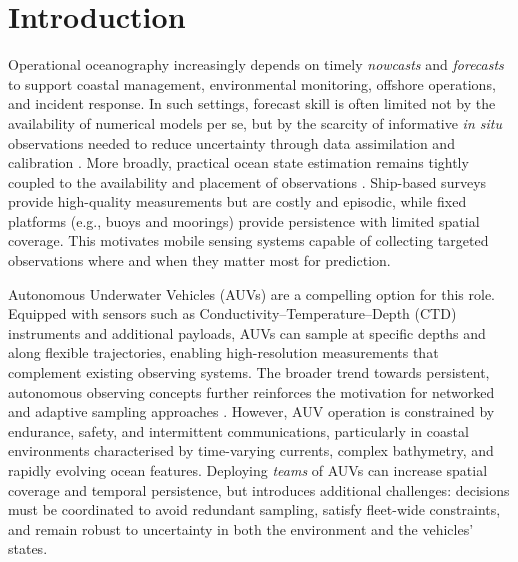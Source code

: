 \chapter{Introduction} \label{chap:intro}

Operational oceanography increasingly depends on timely \emph{nowcasts} and \emph{forecasts} to support coastal
management, environmental monitoring, offshore operations, and incident response. In such settings, forecast skill is
often limited not by the availability of numerical models per se, but by the scarcity of informative \emph{in situ}
observations needed to reduce uncertainty through data assimilation and calibration \cite{dowd2014dataassimilation}.
More broadly, practical ocean state estimation remains tightly coupled to the availability and placement of observations
\cite{wunsch2007stateestimation}. Ship-based surveys provide high-quality measurements but are costly and episodic, while
fixed platforms (e.g., buoys and moorings) provide persistence with limited spatial coverage. This motivates mobile
sensing systems capable of collecting targeted observations where and when they matter most for prediction.

Autonomous Underwater Vehicles (AUVs) are a compelling option for this role. Equipped with sensors such as
Conductivity--Temperature--Depth (CTD) instruments and additional payloads, AUVs can sample at specific depths and along
flexible trajectories, enabling high-resolution measurements that complement existing observing systems. The broader
trend towards persistent, autonomous observing concepts further reinforces the motivation for networked and adaptive
sampling approaches \cite{curtin2009aosn}. However, AUV operation is constrained by endurance, safety, and intermittent
communications, particularly in coastal environments characterised by time-varying currents, complex bathymetry, and
rapidly evolving ocean features. Deploying \emph{teams} of AUVs can increase spatial coverage and temporal persistence,
but introduces additional challenges: decisions must be coordinated to avoid redundant sampling, satisfy fleet-wide
constraints, and remain robust to uncertainty in both the environment and the vehicles' states.

